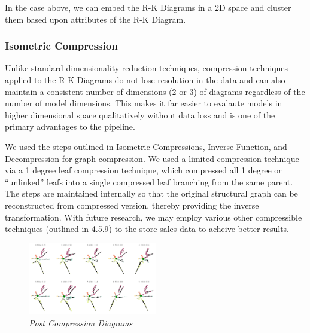 In the case above, we can embed the R-K Diagrams in a 2D space and cluster them based upon attributes of the R-K Diagram.

\subsubsection{Isometric Compression}

Unlike standard dimensionality reduction techniques, compression techniques applied to the R-K Diagrams do not lose resolution in the data and can also maintain a consistent number of dimensions (2 or 3) of diagrams regardless of the number of model dimensions. This makes it far easier to evalaute models in higher dimensional space qualitatively without data loss and is one of the primary advantages to the pipeline.

We used the steps outlined in \hyperref[subsec:compression]{Isometric Compressions, Inverse Function, and Decompression} for graph compression. We used a limited compression technique via a 1 degree leaf compression technique, which compressed all 1 degree or ``unlinked'' leafs into a single compressed leaf branching from the same parent. The steps are maintained internally so that the original structural graph can be reconstructed from compressed version, thereby providing the inverse transformation. With future research, we may employ various other compressible techniques (outlined in 4.5.9) to the store sales data to acheive better results.

\begin{figure}[H]
	\centering
        \includegraphics[width=0.5\textwidth]{images/compressed_store_sales.png}
	\caption{\textit{Post Compression Diagrams}}
	\label{fig:compresseion_example_fig}
\end{figure}



